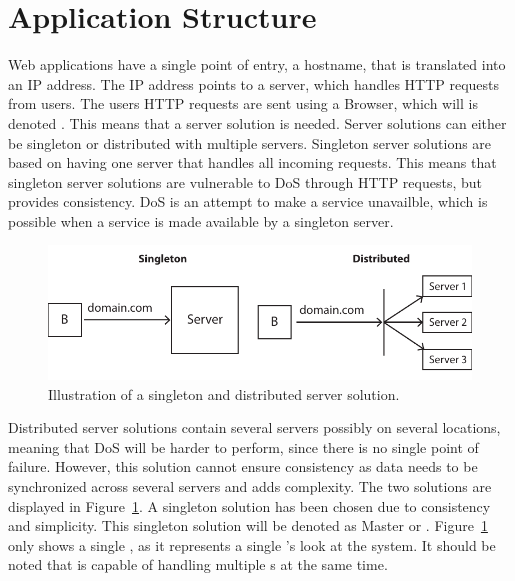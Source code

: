 \section{Application Structure}
\label{sec:application_structure}

Web applications have a single point of entry, a hostname, that is translated into an IP address.
The IP address points to a server, which handles HTTP requests from users. 
The users HTTP requests are sent using a Browser, which will is denoted .
This means that a server solution is needed.
Server solutions can either be singleton or distributed with multiple servers.
Singleton server solutions are based on having one server that handles all incoming requests.
This means that singleton server solutions are vulnerable to \acs{DoS} through HTTP requests, but provides consistency.
\acs{DoS} is an attempt to make a service unavailble, which is possible when a service is made available by a singleton server.

\begin{figure}[htb]
    \centering
    \includegraphics[width=\textwidth]{gfx/server_solutions.pdf}
    \caption{Illustration of a singleton and distributed server solution.}
    \label{fig:server_solutions}
\end{figure}

Distributed server solutions contain several servers possibly on several locations, meaning that DoS will be harder to perform, since there is no single point of failure.
However, this solution cannot ensure consistency as data needs to be synchronized across several servers and adds complexity.
The two solutions are displayed in Figure~\ref{fig:server_solutions}.
A singleton solution has been chosen due to consistency and simplicity.
This singleton solution will be denoted as Master or .
Figure~\ref{fig:server_solutions} only shows a single , as it represents a single 's look at the system.
It should be noted that  is capable of handling multiple s at the same time. \\

